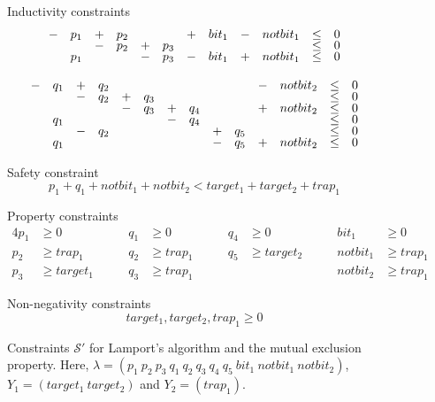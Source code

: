 \begin{figure}[t]
Inductivity constraints
$$
\begin{array}[t]{clclclclclcl}
    -  & p_1 &  +  & p_2 &     &     &  +  & bit_1 &  -  & notbit_1 &  \le  & 0 \\[-0.1cm]
       &     &  -  & p_2 &  +  & p_3 &     &       &     &          &  \le  & 0 \\[-0.1cm]
       & p_1 &     &     &  -  & p_3 &  -  & bit_1 &  +  & notbit_1 &  \le  & 0
\end{array}
$$

$$
\begin{array}[t]{clclclclclclclclclcl}
    -  & q_1 &  +  & q_2 &     &     &     &     &     &     &  -  & notbit_2 &  \le  & 0  \\[-0.1cm]
       &     &  -  & q_2 &  +  & q_3 &     &     &     &     &     &          &  \le  & 0  \\[-0.1cm]
       &     &     &     &  -  & q_3 &  +  & q_4 &     &     &  +  & notbit_2 &  \le  & 0  \\[-0.1cm]
       & q_1 &     &     &     &     &  -  & q_4 &     &     &     &          &  \le  & 0  \\[-0.1cm]
       &     &  -  & q_2 &     &     &     &     &  +  & q_5 &     &          &  \le  & 0  \\[-0.1cm]
       & q_1 &     &     &     &     &     &     &  -  & q_5 &  +  & notbit_2 &  \le  & 0 
\end{array}
$$

Safety constraint
$$
p_1 + q_1 + notbit_1 + notbit_2 < target_1 + target_2 + trap_1
$$

Property constraints
\begin{alignat*}{4}
  p_1 & \ge 0 & \qquad q_1 & \ge 0 & \qquad q_4 & \ge 0 & \qquad bit_1 & \ge 0  \\[-0.1cm]
  p_2 & \ge trap_1 & \qquad q_2 & \ge trap_1 & \qquad q_5 & \ge target_2& \qquad notbit_1 & \ge trap_1 \\[-0.1cm]
  p_3 & \ge target_1  & \qquad q_3 & \ge trap_1 & & & \qquad notbit_2 & \ge trap_1
\end{alignat*}

Non-negativity constraints
$$
  target_1, target_2, trap_1 \ge 0
$$

\caption[Constraints $\mathcal{S}'$ for Lamport's
    algorithm and the mutual exclusion property.]
    {Constraints $\mathcal{S}'$ for Lamport's
algorithm and the mutual exclusion property. Here, $\lambda=(p_1\ p_2\
p_3\ q_1\ q_2\ q_3\ q_4\ q_5\ bit_1\ notbit_1\ notbit_2)$,
$Y_1=(target_1\ target_2)$ and $Y_2=(trap_1)$.}
\label{fig:example-constraints}
\end{figure}

